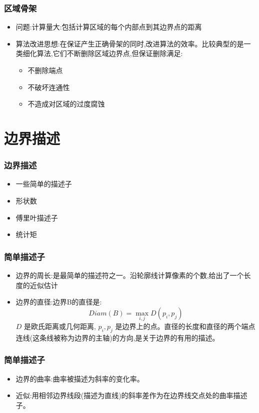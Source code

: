 \documentclass{beamer}
\begin{document}
\begin{frame}
\frametitle{区域骨架}
\label{sec-2-17}

\begin{itemize}
\item 问题:计算量大:包括计算区域的每个内部点到其边界点的距离
\item 算法改进思想:在保证产生正确骨架的同时,改进算法的效率。比较典型的是一类细化算法,它们不断删除区域边界点,但保证删除满足:
\begin{itemize}
\item 不删除端点
\item 不破坏连通性
\item 不造成对区域的过度腐蚀
\end{itemize}
\end{itemize}
\end{frame}
\section{边界描述}
\label{sec-3}
\begin{frame}
\frametitle{边界描述}
\label{sec-3-1}

\begin{itemize}
\item 一些简单的描述子
\item 形状数
\item 傅里叶描述子
\item 统计矩
\end{itemize}
\end{frame}
\begin{frame}
\frametitle{简单描述子}
\label{sec-3-2}

\begin{itemize}
\item 边界的周长:是最简单的描述符之一。沿轮廓线计算像素的个数,给出了一个长度的近似估计
\item 边界的直径:边界B的直径是:
    \[ Diam(B)=\max_{i,j}  D(p_i,p_j) \]
     $D$ 是欧氏距离或几何距离, $p_i,p_j$ 是边界上的点。直径的长度和直径的两个端点连线(这条线被称为边界的主轴)的方向,是关于边界的有用的描述。
\end{itemize}
\end{frame}
\begin{frame}
\frametitle{简单描述子}
\label{sec-3-3}

\begin{itemize}
\item 边界的曲率:曲率被描述为斜率的变化率。
\item 近似:用相邻边界线段(描述为直线)的斜率差作为在边界线交点处的曲率描述子。
\end{itemize}
\end{frame}
\end{document}
